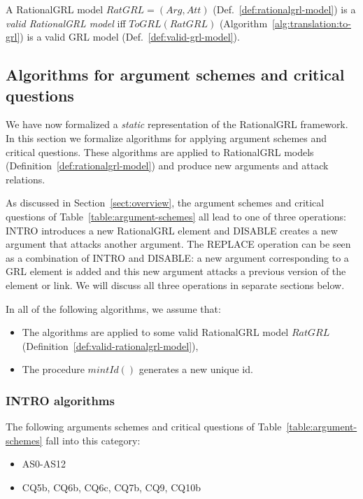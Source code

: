 \begin{definition}
\label{def:valid-rationalgrl-model}
A RationalGRL model $RatGRL = (Arg, Att)$ (Def.~\ref{def:rationalgrl-model})
is a \emph{valid RationalGRL model} iff $ToGRL(RatGRL)$ (Algorithm~\ref{alg:translation:to-grl}) is a valid GRL model (Def.~\ref{def:valid-grl-model}).
\end{definition}


\subsection{Algorithms for argument schemes and critical questions}
\label{sect:algorithms}

We have now formalized a \emph{static} representation of the RationalGRL framework. In this section we formalize algorithms for applying argument schemes and critical questions. These algorithms are applied to RationalGRL models (Definition~\ref{def:rationalgrl-model}) and produce new arguments and attack relations. 

As discussed in Section~\ref{sect:overview}, the argument schemes and critical questions of Table~\ref{table:argument-schemes} all lead to one of three operations: \textsf{INTRO}
introduces a new RationalGRL element and \textsf{DISABLE} creates a new argument that attacks another argument. The \textsf{REPLACE} operation can be seen as a combination of \textsf{INTRO} and \textsf{DISABLE}: a new argument corresponding to a GRL element is added and this new argument attacks a previous version of the element or link. We will discuss all three operations in separate sections below.

In all of the following algorithms, we assume that:
\begin{itemize}
\item The algorithms are applied to some valid RationalGRL model $RatGRL$ (Definition~\ref{def:valid-rationalgrl-model}),
\item The procedure $mintId()$ generates a new unique id.
\end{itemize}

\subsubsection{INTRO algorithms}
\label{sect:formalframework:intro}

The following arguments schemes and critical questions of Table~\ref{table:argument-schemes} fall into this category:
\begin{itemize}
\item AS0-AS12
\item CQ5b, CQ6b, CQ6c, CQ7b, CQ9, CQ10b
\end{itemize}

